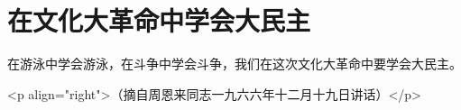 \section[在文化大革命中学会大民主（一九六六年十二月）]{在文化大革命中学会大民主}


在游泳中学会游泳，在斗争中学会斗争，我们在这次文化大革命中要学会大民主。

<p align="right">（摘自周恩来同志一九六六年十二月十九日讲话）</p>



